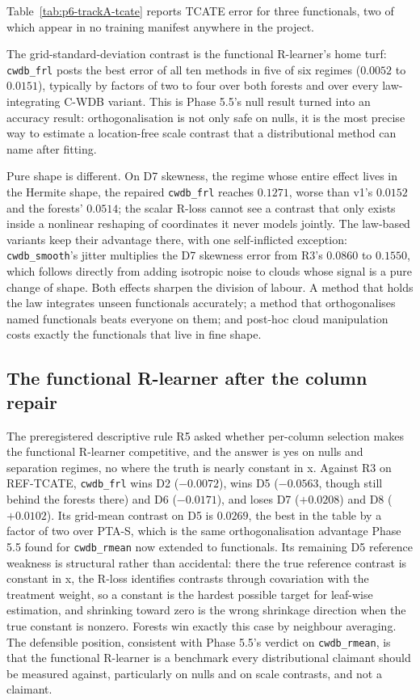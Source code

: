 Table~\ref{tab:p6-trackA-tcate} reports TCATE error for three functionals, two
of which appear in no training manifest anywhere in the project.

The grid-standard-deviation contrast is the functional R-learner's home turf:
\texttt{cwdb\_frl} posts the best error of all ten methods in five of six
regimes ($0.0052$ to $0.0151$), typically by factors of two to four over both
forests and over every law-integrating C-WDB variant. This is Phase 5.5's null
result turned into an accuracy result: orthogonalisation is not only safe on
nulls, it is the most precise way to estimate a location-free scale contrast
that a distributional method can name after fitting.

Pure shape is different. On D7 skewness, the regime whose entire effect lives
in the Hermite shape, the repaired \texttt{cwdb\_frl} reaches $0.1271$, worse
than v1's $0.0152$ and the forests' $0.0514$; the scalar R-loss cannot see a
contrast that only exists inside a nonlinear reshaping of coordinates it never
models jointly. The law-based variants keep their advantage there, with one
self-inflicted exception: \texttt{cwdb\_smooth}'s jitter multiplies the D7
skewness error from R3's $0.0860$ to $0.1550$, which follows directly from
adding isotropic noise to clouds whose signal is a pure change of shape. Both
effects sharpen the division of labour. A method that holds the law integrates
unseen functionals accurately; a method that orthogonalises named functionals
beats everyone on them; and post-hoc cloud manipulation costs exactly the
functionals that live in fine shape.

\subsection{The functional R-learner after the column repair}
\label{sub:p6-frl}

The preregistered descriptive rule R5 asked whether per-column selection makes
the functional R-learner competitive, and the answer is yes on nulls and
separation regimes, no where the truth is nearly constant in x. Against R3 on
REF-TCATE, \texttt{cwdb\_frl} wins D2 ($-0.0072$), wins D5 ($-0.0563$, though
still behind the forests there) and D6 ($-0.0171$), and loses D7 ($+0.0208$)
and D8 ($+0.0102$). Its grid-mean contrast on D5 is $0.0269$, the best in the
table by a factor of two over PTA-S, which is the same orthogonalisation
advantage Phase 5.5 found for \texttt{cwdb\_rmean} now extended to functionals.
Its remaining D5 reference weakness is structural rather than accidental:
there the true reference contrast is constant in x, the R-loss identifies
contrasts through covariation with the treatment weight, so a constant is the
hardest possible target for leaf-wise estimation, and shrinking toward zero is
the wrong shrinkage direction when the true constant is nonzero. Forests win
exactly this case by neighbour averaging. The defensible position, consistent
with Phase 5.5's verdict on \texttt{cwdb\_rmean}, is that the functional
R-learner is a benchmark every distributional claimant should be measured
against, particularly on nulls and on scale contrasts, and not a claimant.

